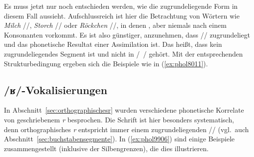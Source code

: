 Es muss jetzt nur noch entschieden werden, wie die zugrundeliegende Form in diesem Fall aussieht.
Aufschlussreich ist hier die Betrachtung von Wörtern wie \textit{Milch} //, \textit{Storch} // oder \textit{Röckchen} //, in denen \textipa{[\c{c}]}, aber niemals \textipa{[X]} nach einem Konsonanten vorkommt.
Es ist also günstiger, anzunehmen, dass // zugrundeliegt und \textipa{[X]} das phonetische Resultat einer Assimilation ist.
Das heißt, dass \textipa{[X]} kein zugrundeliegendes Segment ist und nicht in /~/ gehört.
Mit der entsprechenden Strukturbedingung ergeben sich die Beispiele wie in (\ref{ex:phol8011}).


\begin{exe}
  \ex\label{ex:phol8011}
  \begin{xlist}
  \end{xlist}
\end{exe}

\subsection{/ʁ/-Vokalisierungen}

\label{sec:rvokalisierungen}

In Abschnitt~\ref{sec:orthographischesr} wurden verschiedene phonetische Korrelate von geschriebenem \textit{r} besprochen.
Die Schrift ist hier besonders systematisch, denn orthographisches \textit{r} entspricht immer einem zugrundeliegenden // (vgl.\ auch Abschnitt~\ref{sec:buchstabensegmente}).
In (\ref{ex:phol9906}) sind einige Beispiele zusammengestellt (inklusive der Silbengrenzen), die dies illustrieren.

\begin{exe}
  \ex\label{ex:phol9906}
  \begin{xlist}
  \end{xlist}
\end{exe}

